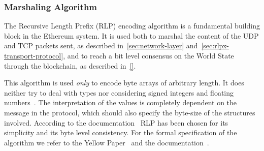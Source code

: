 \subsubsection{Marshaling Algorithm}
\label{sec:marshaling}
The Recursive Length Prefix (RLP) encoding algorithm is a fundamental building
block in the Ethereum system.
It is used both to marshal the content
of the UDP and TCP packets sent, as described in~\autoref{sec:network-layer} and~\autoref{sec:rlpx-transport-protocol}, and
to reach a bit level consensus on the World State through the blockchain, as 
described in~\autoref{}.


This algorithm is used \emph{only} to encode byte arrays of arbitrary length.
It does neither try to deal with types nor considering signed integers and
floating numbers~\cite{wood2018ethereum}. The interpretation of the values
is completely dependent on the message in the protocol, which should
also specify the byte-size of the structures involved.
According to the documentation~\cite{bib:design-rationale} RLP has been chosen
for its simplicity and its byte level consistency.
For the formal specification of the algorithm we refer 
to the Yellow Paper~\cite[Appendix B]{wood2018ethereum} and the
documentation~\cite{bib:ethereumrlpspec}.
